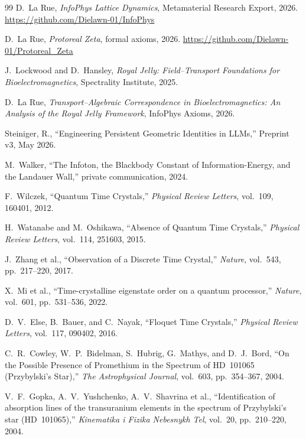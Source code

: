 \begin{thebibliography}{99}
 D.~La Rue, \emph{InfoPhys Lattice Dynamics}, Metamaterial Research Export, 2026. \url{https://github.com/Dielawn-01/InfoPhys}

 D.~La Rue, \emph{Protoreal Zeta}, formal axioms, 2026. \url{https://github.com/Dielawn-01/Protoreal_Zeta}

 J.~Lockwood and D.~Hansley, \emph{Royal Jelly: Field--Transport Foundations for Bioelectromagnetics}, Spectrality Institute, 2025.

 D.~La Rue, \emph{Transport--Algebraic Correspondence in Bioelectromagnetics: An Analysis of the Royal Jelly Framework}, InfoPhys Axioms, 2026.

Steiniger, R.,
``Engineering Persistent Geometric Identities in LLMs,''
Preprint v3, May 2026.

M.~Walker, ``The Infoton, the Blackbody Constant of Information-Energy, and the
Landauer Wall,'' private communication, 2024.

F.~Wilczek,
``Quantum Time Crystals,''
\emph{Physical Review Letters}, vol.~109, 160401, 2012.

H.~Watanabe and M.~Oshikawa,
``Absence of Quantum Time Crystals,''
\emph{Physical Review Letters}, vol.~114, 251603, 2015.

J.~Zhang et al.,
``Observation of a Discrete Time Crystal,''
\emph{Nature}, vol.~543, pp.~217--220, 2017.

X.~Mi et al.,
``Time-crystalline eigenstate order on a quantum processor,''
\emph{Nature}, vol.~601, pp.~531--536, 2022.

D.~V.~Else, B.~Bauer, and C.~Nayak,
``Floquet Time Crystals,''
\emph{Physical Review Letters}, vol.~117, 090402, 2016.

C.~R.~Cowley, W.~P.~Bidelman, S.~Hubrig, G.~Mathys, and D.~J.~Bord,
``On the Possible Presence of Promethium in the Spectrum of HD~101065 (Przybylski's Star),''
\emph{The Astrophysical Journal}, vol.~603, pp.~354--367, 2004.

V.~F.~Gopka, A.~V.~Yushchenko, A.~V.~Shavrina et al.,
``Identification of absorption lines of the transuranium elements in the spectrum of Przybylski's star (HD~101065),''
\emph{Kinematika i Fizika Nebesnykh Tel}, vol.~20, pp.~210--220, 2004.


\end{thebibliography}

